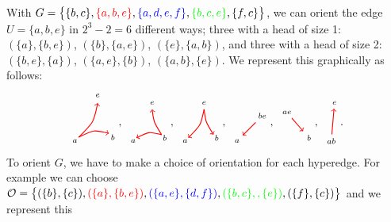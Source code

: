 \documentclass[ALCO,ThmDefs,Unicode,epreuves]{cedram}
\newcommand{\blueun}[1]{\textcolor{blue}{#1}}
\newcommand{\redun}[1]{\textcolor{red}{#1}}
\newcommand{\greenun}[1]{\textcolor{green}{#1}}
\begin{document}
\begin{exam}\label{hypergraph}
With $G=\big\{\{b,c\},\redun{\{a,b,e\}},\blueun{\{a,d,e,f\}},\greenun{\{b,c,e\}},\{f,c\}\big\}$, we can orient the edge $U=\{a,b,e\}$ in $2^3-2=6$ different ways; three with a head of size 1: $(\{a\},\{b,e\})$, $(\{b\},\{a,e\})$, $(\{e\},\{a,b\})$, and three with a head of size 2: $(\{b,e\},\{a\})$, $(\{a,e\},\{b\})$, $(\{a,b\},\{e\})$. We represent this graphically as follows:
$$
\begin{tikzpicture}[scale=1.2,baseline=.5cm]
	\node (a) at (0,0) {$\scriptstyle a$};
	\node (b) at (1,.1) {$\scriptstyle b$};
	\node (e) at (.6,1.2) {$\scriptstyle e$};
	\draw [thick,color=red,->] (.1,.1) .. controls (.5,.3) .. (.9,.2) ; 
	\draw [thick,color=red,<-] (.6,1) .. controls (.5,.5) .. (.1,.1) ; 
\end{tikzpicture} ,\ 
\begin{tikzpicture}[scale=1,baseline=.5cm]
	\node (a) at (0,0) {$\scriptstyle a$};
	\node (b) at (1,.1) {$\scriptstyle b$};
	\node (e) at (.6,1.2) {$\scriptstyle e$};
	\draw [thick,color=red,->] (.9,.2) .. controls (.65,.6) .. (.6,1); 
	\draw [thick,color=red,<-] (.1,.1) .. controls (.5,.3) .. (.9,.2) ; 
\end{tikzpicture} ,\ 
\begin{tikzpicture}[scale=1,baseline=.5cm]
	\node (a) at (0,0) {$\scriptstyle a$};
	\node (b) at (1,.1) {$\scriptstyle b$};
	\node (e) at (.6,1.2) {$\scriptstyle e$};
	\draw [thick,color=red,->] (.6,1) .. controls (.5,.5) .. (.1,.1); 
	\draw [thick,color=red,<-] (.9,.2) .. controls (.65,.6) .. (.6,1) ; 
\end{tikzpicture} ,\ 
\begin{tikzpicture}[scale=1,baseline=.5cm]
	\node (a) at (0,0) {$\scriptstyle a$};
	\node (b) at (.8,.8) {$\scriptstyle be$};
	\draw [thick,color=red,->] (b) -- (a); 
\end{tikzpicture} ,\ 
\begin{tikzpicture}[scale=1,baseline=.5cm]
	\node (a) at (1,.1) {$\scriptstyle b$};
	\node (b) at (.3,.9) {$\scriptstyle ae$};
	\draw [thick,color=red,->] (b) -- (a); 
\end{tikzpicture} ,\ 
\begin{tikzpicture}[scale=1,baseline=.5cm]
	\node (a) at (.6,1.2) {$\scriptstyle e$};
	\node (b) at (.5,0) {$\scriptstyle ab$};
	\draw [thick,color=red,->] (b) -- (a); 
\end{tikzpicture}.
$$
To orient $G$, we have to make a choice of orientation for each hyperedge. For example we can choose 
 $\mathcal{O}=\big\{(\{b\},\{c\}),\redun{(\{a\},\{b,e\})},\blueun{(\{a,e\},\{d,f\})},\greenun{(\{b,c\},,\{e\})},(\{f\},\{c\})\big\}$ and we represent this

\end{exam}
\end{document}
